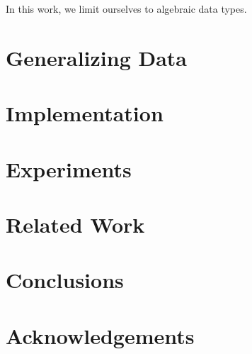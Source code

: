 \documentclass[9pt]{sigplanconf}
\begin{document}


In this work, we limit ourselves to algebraic data types.


\section{Generalizing Data}


\section{Implementation}


\section{Experiments}



\section{Related Work}
\label{sec:related}


\cite{}

\section{Conclusions}
\label{sec:conclusions}


\section*{Acknowledgements}




\end{document}
